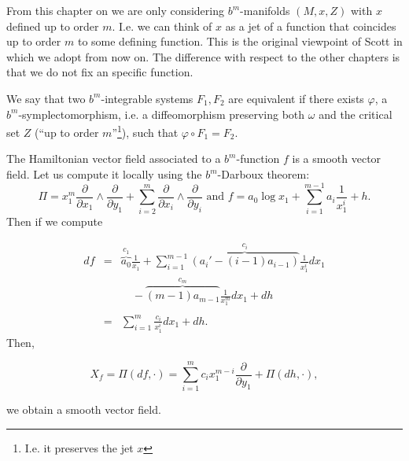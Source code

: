 \begin{remark}
From this chapter on we are only considering $b^m$-manifolds $(M,x,Z)$ with $x$ defined up to order $m$. I.e. we can think of $x$ as a jet of a function that coincides up to order $m$ to some defining function.
This is the original viewpoint of Scott in \cite{Scott16} which we adopt from now on. The difference with respect to the other chapters is that we do not fix an specific function.
\end{remark}


\begin{definition}
We say that two $b^m$-integrable systems $F_1, F_2$ are equivalent if there exists $\varphi$, a $b^m$-symplectomorphism, i.e. a diffeomorphism preserving both $\omega$ and the critical set $Z$ (``up to order $m$''\textcolor{black}{\footnote{I.e. it preserves the jet $x$}}), such that  $\varphi \circ F_1 = F_2$.
\end{definition}

\begin{remark}
The Hamiltonian vector field associated to a $b^m$-function $f$ is a smooth vector field. Let us compute it  locally using the $b^m$-Darboux theorem:
$$\Pi = x_1^m\frac{\partial}{\partial x_1} \wedge \frac{\partial}{\partial y_1} + \sum_{i = 2}^{m} \frac{\partial}{\partial x_i}\wedge\frac{\partial}{\partial y_i} \text{ and } f = a_0 \log{x_1} + \sum_{i = 1}^{m-1}a_i \frac{1}{x_1^i} + h.$$
Then if we compute

$$\begin{array}{rcl}
\displaystyle df & = & \displaystyle \overbrace{a_0}^{c_1}\frac{1}{x_1} + \sum_{i=1}^{m-1} \overbrace{(a_i' - (i-1)a_{i-1})}^{c_i}\frac{1}{x_1^i} dx_1 \\
& & \quad -\overbrace{(m-1)a_{m-1}}^{c_m}\frac{1}{x_1^m}dx_1 + dh\\
\\
 & = & \displaystyle \sum_{i = 1}^{m}\frac{c_i}{x_1^i} dx_1 + dh.
\end{array}$$
Then,

\begin{equation}\label{eq:bmhamiltonianvf}
X_f = \Pi(df,\cdot) = \sum_{i=1}^{m} c_i x_1^{m-i}\frac{\partial}{\partial y_1} + \Pi(dh,\cdot),
\end{equation}

 we obtain a smooth vector field.



\end{remark}


